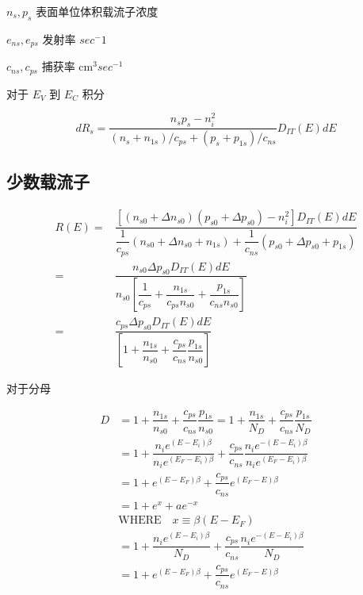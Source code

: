 \documentclass[cn,11pt,chinese,black,simple]{../elegantbook}
\begin{document}
\(n_s, p_s\) 表面单位体积载流子浓度

\(e_{ns}, e_{ps}\) 发射率 \(sec^-1\)

\(c_{ns}, c_{ps}\) 捕获率 \(\text{cm}^3 sec^{-1}\)

对于 \(E_V\) 到 \(E_C\) 积分

\[d R_{ s }=\dfrac{n_{ s } p_{ s }-n_{ i }^{2}}{\left(n_{ s }+n_{1 s }\right) / c_{ ps }+\left(p_{ s }+p_{1 s }\right) / c_{ ns }} D_{ IT }(E) d E\]

\subsection{少数载流子}

\[\begin{aligned}
    R(E)=& \dfrac{\left[\left(n_{s 0}+\Delta n_{s 0}\right)\left(p_{s 0}+\Delta p_{s 0}\right)-n_{i}^{2}\right] D_{I T}(E) d E}{\dfrac{1}{c_{p s}}\left(n_{s 0}+\Delta n_{s 0}+n_{1 s}\right)+\dfrac{1}{c_{n s}}\left(p_{s 0}+\Delta p_{s 0}+p_{1 s}\right)} \\
    =& \dfrac{n_{s 0} \Delta p_{s 0} D_{I T}(E) d E}{n_{s 0}\left[\dfrac{1}{c_{p s}}+\dfrac{n_{1 s}}{c_{p s} n_{s 0}}+\dfrac{p_{1 s}}{c_{n s} n_{s 0}}\right]} \\
    =& \dfrac{c_{p s} \Delta p_{s 0} D_{I T}(E) d E}{\left[1+\dfrac{n_{1 s}}{n_{s 0}}+\dfrac{c_{p s}}{c_{n s}} \dfrac{p_{1 s}}{n_{s 0}}\right]}
\end{aligned}\]

对于分母 

\[\begin{aligned}
    D &=1+\dfrac{n_{1 s}}{n_{s 0}}+\dfrac{c_{p s}}{c_{n s}} \dfrac{p_{1 s}}{n_{s 0}}=1+\dfrac{n_{1 s}}{N_{D}}+\dfrac{c_{p s}}{c_{n s}} \dfrac{p_{1 s}}{N_{D}} \\
    &=1+\dfrac{n_{i} e^{\left(E-E_{i}\right) \beta}}{n_{i} e^{\left(E_{F}-E_{i}\right) \beta}}+\dfrac{c_{p s}}{c_{n s}} \dfrac{n_{i} e^{-\left(E-E_{i}\right) \beta}}{n_{i} e^{\left(E_{F}-E_{i}\right) \beta}} \\
    &=1+e^{\left(E-E_{F}\right) \beta}+\dfrac{c_{p s}}{c_{n s}} e^{\left(E_{F}-E\right) \beta} \\
    &=1+e^{x}+a e^{-x}\\
    &\text{WHERE}\quad x \equiv \beta\left(E-E_{F}\right)\\
    &=1+\dfrac{n_{i} e^{\left(E-E_{i}\right) \beta}}{N_{D}}+\dfrac{c_{p s}}{c_{n s}} \dfrac{n_{i} e^{-\left(E-E_{i}\right) \beta}}{N_{D}} \\
    &=1+e^{\left(E-E_{F}\right) \beta}+\dfrac{c_{p s}}{c_{n s}} e^{\left(E_{F}-E\right) \beta}
\end{aligned}\]
\end{document}

